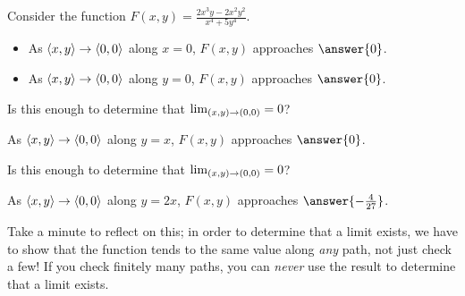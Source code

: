 \documentclass{ximera}
\author{Jim Talamo}
\begin{document}
\begin{exercise}
  Consider the function $F(x,y)= \frac{2x^3y-2x^2y^2}{x^4+5y^4}$.
  
  \begin{itemize}
  \item As $\left\langle x,y\right\rangle \to \left\langle 0,0\right\rangle$ along $x=0$, $F(x,y)$ approaches $\answer{0}$.
  \item As $\left\langle x,y\right\rangle \to \left\langle 0,0\right\rangle$ along $y=0$, $F(x,y)$ approaches $\answer{0}$.
  \end{itemize}
  
   Is this enough to determine that $\lim_{\left(x,y\right) \to \left(0,0\right)} = 0$? 
   
   \begin{exercise}
   As $\left\langle x,y\right\rangle \to \left\langle 0,0\right\rangle$ along $y=x$, $F(x,y)$ approaches $\answer{0}$.
   
  Is this enough to determine that $\lim_{\left(x,y\right) \to \left(0,0\right)} = 0$? 
      
  \begin{exercise}
     As $\left\langle x,y\right\rangle \to \left\langle 0,0\right\rangle$ along $y=2x$, $F(x,y)$ approaches $\answer{-\frac{4}{27}}$.

\begin{multipleChoice}
\end{multipleChoice}

\begin{feedback}[correct]
Take a minute to reflect on this; in order to determine that a limit exists, we have to show that the function tends to the same value along \emph{any} path, not just check a few!  If you check finitely many paths, you can \emph{never} use the result to determine that a limit exists.   
\end{feedback}
   \end{exercise}
   \end{exercise}
   \end{exercise}
\end{document}
